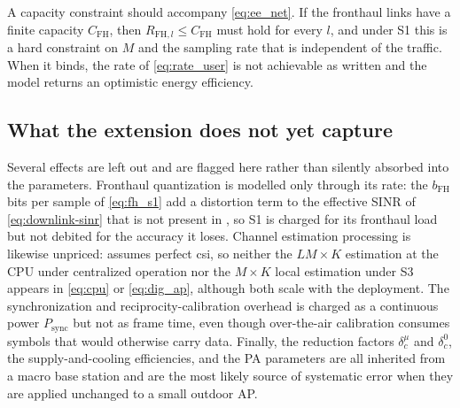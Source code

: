 A capacity constraint should accompany \eqref{eq:ee_net}. If the fronthaul links
have a finite capacity $C_{\mathrm{FH}}$, then $R_{\mathrm{FH},l}\leq
C_{\mathrm{FH}}$ must hold for every $l$, and under S1 this is a hard constraint
on $M$ and the sampling rate that is independent of the traffic. When it binds,
the rate of \eqref{eq:rate_user} is not achievable as written and the model
returns an optimistic energy efficiency.

\subsection{What the extension does not yet capture}
\label{ssec:dmimo_gaps}

Several effects are left out and are flagged here rather than silently absorbed
into the parameters. Fronthaul quantization is modelled only through its rate:
the $b_{\mathrm{FH}}$ bits per sample of \eqref{eq:fh_s1} add a distortion term
to the effective SINR of \eqref{eq:downlink-sinr} that is not present in
, so S1 is charged for its fronthaul load but not
debited for the accuracy it loses. Channel estimation processing is likewise
unpriced:  assumes perfect \gls{csi}, so neither the
$LM\times K$ estimation at the CPU under centralized operation nor the $M\times
K$ local estimation under S3 appears in \eqref{eq:cpu} or \eqref{eq:dig_ap},
although both scale with the deployment. The synchronization and
reciprocity-calibration overhead is charged as a continuous power
$P_{\mathrm{sync}}$ but not as frame time, even though over-the-air calibration
consumes symbols that would otherwise carry data. Finally, the reduction factors
$\delta^{\mu}_{c}$ and $\delta^{0}_{c}$, the supply-and-cooling efficiencies, and
the PA parameters are all inherited from a macro base station and are the most
likely source of systematic error when they are applied unchanged to a
small outdoor AP.

